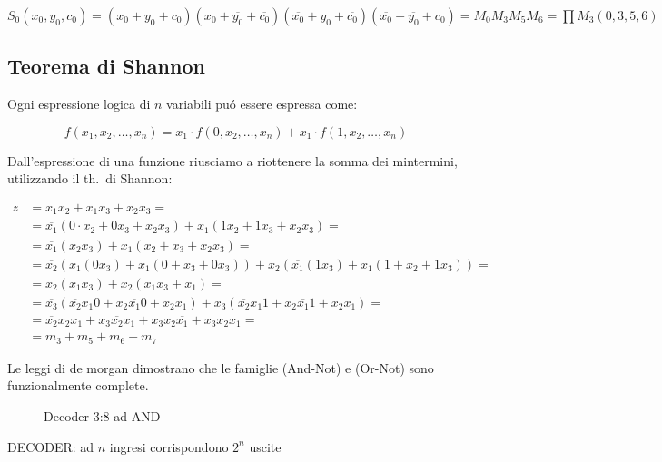 \documentclass{article}
\begin{document}
$S_0 (x_0, y_0, c_0) = (x_0 + y_0 + c_0) (x_0 + \overline{y_0} + \overline{c_0}) (\overline{x_0} + y_0 + \overline{c_0}) (\overline{x_0} + \overline{y_0} + c_0) = M_0 M_3 M_5 M_6 = \prod M_3(0, 3, 5, 6)$


\subsection{Teorema di Shannon}
Ogni espressione logica di $n$ variabili pu\'o essere espressa come:

\[f(x_1, x_2, \ldots, x_n) = x_1 \cdot f(0, x_2, \ldots, x_n) + x_1 \cdot f(1, x_2, \ldots, x_n)\]

Dall'espressione di una funzione riusciamo a riottenere la somma dei mintermini, utilizzando il th.\ di Shannon:

\[
    \begin{split}
        z &= x_1 x_2 + x_1 x_3 + x_2 x_3 = \\
         &= \overline{x_1} ( 0 \cdot x_2 + 0 x_3 + x_2 x_3) + x_1 (1 x_2 + 1 x_3 + x_2 x_3) = \\
         &= \overline{x_1} (x_2 x_3) + x_1 (x_2 + x_3 + x_2 x_3) = \\
         &= \overline{x_2} (x_1 (0 x_3) + x_1 (0 + x_3 + 0 x_3)) + x_2 (\overline{x_1} (1 x_3) + x_1 (1 + x_2 + 1 x_3)) =\\
         &= \overline{x_2} (x_1 x_3) + x_2 (\overline{x_1} x_3 + x_1) =\\
         &= \overline{x_3} (\overline{x_2} x_1 0 + x_2 \overline{x_1} 0 + x_2 x_1) + x_3 (\overline{x_2} x_1 1 + x_2 \overline{x_1} 1 + x_2 x_1) =\\
         &= \overline{x_2} x_2 x_1 + x_3 \overline{x_2} x_1 + x_3 x_2 \overline{x_1} + x_3 x_2 x_1 =\\
         &= m_3 + m_5 + m_6 + m_7
  \end{split}
  \]


Le leggi di de morgan dimostrano che le famiglie (And-Not) e (Or-Not) sono funzionalmente complete.

\begin{figure}[ht]
    
    \centering
    \caption{Decoder 3:8 ad AND}
\end{figure}

DECODER: ad $n$ ingresi corrispondono $2^n$ uscite

\end{document}
